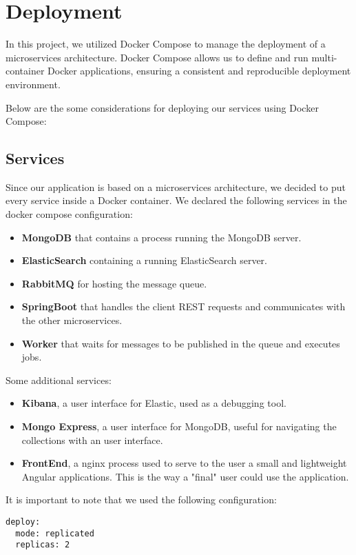 \section{Deployment}

In this project, we utilized Docker Compose to manage the deployment of a
microservices architecture. Docker Compose allows us to define and run
multi-container Docker applications, ensuring a consistent and reproducible
deployment environment.

Below are the some considerations for
deploying our services using Docker Compose:

\subsection{Services}
Since our application is based on a microservices architecture, we decided
to put every service inside a Docker container.
We declared the following services in the docker compose configuration:
\begin{itemize}
        \item \textbf{MongoDB} that contains a process running the MongoDB server.
        \item \textbf{ElasticSearch} containing a running ElasticSearch server.
        \item \textbf{RabbitMQ} for hosting the message queue.
        \item \textbf{SpringBoot} that handles the client REST requests and
                communicates with the other microservices.
        \item \textbf{Worker} that waits for messages to be published in the
                queue and executes jobs.
\end{itemize}
Some additional services:
\begin{itemize}
        \item \textbf{Kibana}, a user interface for Elastic, used as a debugging
                tool.
        \item \textbf{Mongo Express}, a user interface for MongoDB, useful
                for navigating the collections with an user interface.
        \item \textbf{FrontEnd}, a nginx process used to serve to the user
                a small and lightweight Angular applications. This is the
                way a "final" user could use the application.
\end{itemize}

It is important to note that we used the following configuration:
\begin{lstlisting}[frame=single,caption=Replicas of a services,label=replicas]
deploy:
  mode: replicated
  replicas: 2
\end{lstlisting}

